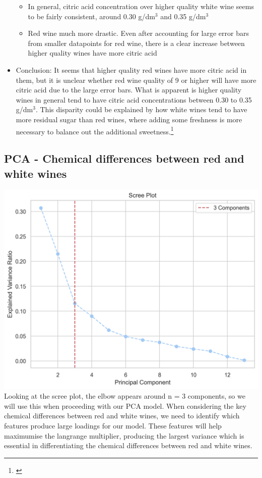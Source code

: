 \documentclass[
]{article}
\providecommand{\tightlist}{%
  \setlength{\itemsep}{0pt}\setlength{\parskip}{0pt}}
\begin{document}
\begin{itemize}
  \begin{itemize}
  \tightlist
  \item
    In general, citric acid concentration over higher quality white wine
    seems to be fairly consistent, around 0.30 g/dm\(^3\) and 0.35
    g/dm\(^3\)
  \item
    Red wine much more drastic. Even after accounting for large error
    bars from smaller datapoints for red wine, there is a clear increase
    between higher quality wines have more citric acid
  \end{itemize}
\item
  Conclusion: It seems that higher quality red wines have more citric
  acid in them, but it is unclear whether red wine quality of 9 or
  higher will have more citric acid due to the large error bars. What is
  apparent is higher quality wines in general tend to have citric acid
  concentrations between 0.30 to 0.35 g/dm\(^3\). This disparity could
  be explained by how white wines tend to have more residual sugar than
  red wines, where adding some freshness is more necessary to balance
  out the additional sweetness.\footnote{\textcite{RN1}}
\end{itemize}

\subsection{PCA - Chemical differences between red and white
wines}\label{pca---chemical-differences-between-red-and-white-wines}

\includegraphics{Scree_plot.png} Looking at the scree plot, the elbow
appears around n = 3 components, so we will use this when proceeding
with our PCA model. When considering the key chemical differences
between red and white wines, we need to identify which features produce
large loadings for our model. These features will help maximumise the
langrange multiplier, producing the largest variance which is essential
in differentiating the chemical differences between red and white wines.
\end{document}
